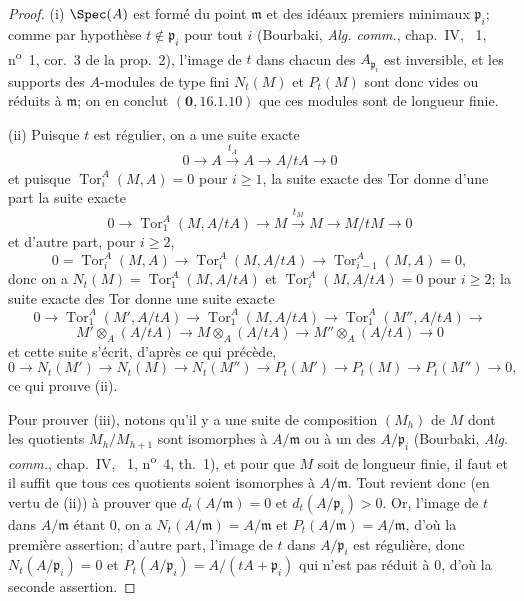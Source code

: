\begin{proof}
(i) $\Spec(A)$ est formé du point $\mathfrak{m}$ et des idéaux premiers minimaux $\mathfrak{p}_i$;
comme par hypothèse $t\notin\mathfrak{p}_i$ pour tout $i$ (Bourbaki, \emph{Alg. comm.}, chap.~IV, \textsection~1, n\textsuperscript{o}~1, cor.~3 de la prop.~2), l'image de $t$ dans chacun des $A_{\mathfrak{p}_i}$ est inversible, et les supports des $A$-modules de type fini $N_t(M)$ et $P_t(M)$ sont donc vides ou réduits à $\mathfrak{m}$;
on en conclut $(\mathbf{0},16.1.10)$ que ces modules sont de longueur finie.

(ii) Puisque $t$ est régulier, on a une suite exacte
\[
  0\to A\xrightarrow{t_A}A\to A/tA\to0
\]
et puisque $\operatorname{Tor}_i^A(M,A)=0$ pour $i\geq1$, la suite exacte des Tor donne d'une part la suite exacte
\[
  0\to\operatorname{Tor}_1^A(M,A/tA)\to M\xrightarrow{t_M}M\to M/tM\to0
\]
et d'autre part, pour $i\geq2$,
\[
  0=\operatorname{Tor}_i^A(M,A)\to\operatorname{Tor}_i^A(M,A/tA)\to\operatorname{Tor}_{i-1}^A(M,A)=0,
\]
donc on a $N_t(M)=\operatorname{Tor}_1^A(M,A/tA)$ et $\operatorname{Tor}_i^A(M,A/tA)=0$ pour $i\geq2$;
la suite exacte des Tor donne une suite exacte
\[
  0\to\operatorname{Tor}_1^A(M',A/tA)\to\operatorname{Tor}_1^A(M,A/tA)\to\operatorname{Tor}_1^A(M'',A/tA)\to
\]
\[
  M'\otimes_A(A/tA)\to M\otimes_A(A/tA)\to M''\otimes_A(A/tA)\to0
\]
et cette suite s'écrit, d'après ce qui précède,
\[
  0\to N_t(M')\to N_t(M)\to N_t(M'')\to P_t(M')\to P_t(M)\to P_t(M'')\to0,
\]
ce qui prouve (ii).

Pour prouver (iii), notons qu'il y a une suite de composition $(M_h)$ de $M$ dont les quotients $M_h/M_{h+1}$ sont isomorphes à $A/\mathfrak{m}$ ou à un des $A/\mathfrak{p}_i$ (Bourbaki, \emph{Alg. comm.}, chap.~IV, \textsection~1, n\textsuperscript{o}~4, th.~1), et pour que $M$ soit de longueur finie, il faut et il suffit que tous ces quotients soient isomorphes à $A/\mathfrak{m}$.
Tout revient donc (en vertu de (ii)) à prouver que $d_t(A/\mathfrak{m})=0$ et $d_t(A/\mathfrak{p}_i)>0$.
Or, l'image de $t$ dans $A/\mathfrak{m}$ étant $0$, on a $N_t(A/\mathfrak{m})=A/\mathfrak{m}$ et $P_t(A/\mathfrak{m})=A/\mathfrak{m}$, d'où la première assertion;
d'autre part, l'image de $t$ dans $A/\mathfrak{p}_i$ est régulière, donc $N_t(A/\mathfrak{p}_i)=0$ et $P_t(A/\mathfrak{p}_i)=A/(tA+\mathfrak{p}_i)$ qui n'est pas réduit à $0$, d'où la seconde assertion.


\end{proof}
